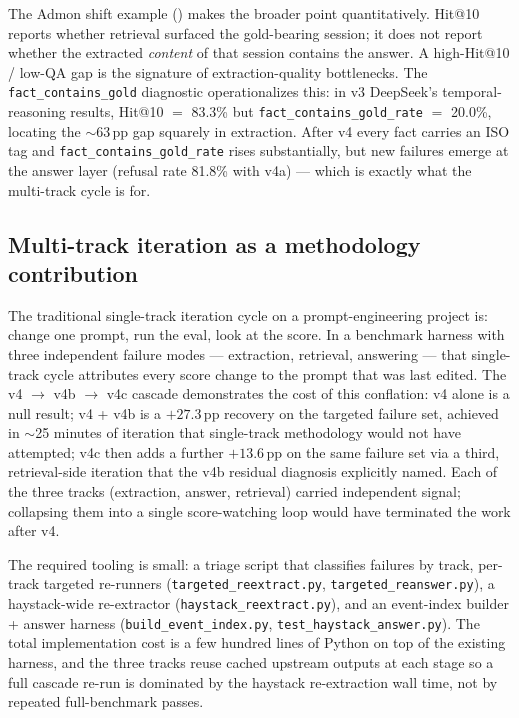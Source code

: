 \documentclass{article}
\begin{document}
The Admon shift example () makes the broader point quantitatively. Hit@10 reports whether retrieval surfaced the gold-bearing session; it does not report whether the extracted \emph{content} of that session contains the answer. A high-Hit@10 / low-QA gap is the signature of extraction-quality bottlenecks. The \texttt{fact\_contains\_gold} diagnostic operationalizes this: in v3 DeepSeek's temporal-reasoning results, Hit@10 $=$ 83.3\% but \texttt{fact\_contains\_gold\_rate} $=$ 20.0\%, locating the $\sim$63\,pp gap squarely in extraction. After v4 every fact carries an ISO tag and \texttt{fact\_contains\_gold\_rate} rises substantially, but new failures emerge at the answer layer (refusal rate 81.8\% with v4a) --- which is exactly what the multi-track cycle is for.

\subsection{Multi-track iteration as a methodology contribution}

The traditional single-track iteration cycle on a prompt-engineering project is: change one prompt, run the eval, look at the score. In a benchmark harness with three independent failure modes --- extraction, retrieval, answering --- that single-track cycle attributes every score change to the prompt that was last edited. The v4 $\to$ v4b $\to$ v4c cascade demonstrates the cost of this conflation: v4 alone is a null result; v4 + v4b is a $+27.3$\,pp recovery on the targeted failure set, achieved in $\sim$25 minutes of iteration that single-track methodology would not have attempted; v4c then adds a further $+13.6$\,pp on the same failure set via a third, retrieval-side iteration that the v4b residual diagnosis explicitly named. Each of the three tracks (extraction, answer, retrieval) carried independent signal; collapsing them into a single score-watching loop would have terminated the work after v4.

The required tooling is small: a triage script that classifies failures by track, per-track targeted re-runners (\texttt{targeted\_reextract.py}, \texttt{targeted\_reanswer.py}), a haystack-wide re-extractor (\texttt{haystack\_reextract.py}), and an event-index builder + answer harness (\texttt{build\_event\_index.py}, \texttt{test\_haystack\_answer.py}). The total implementation cost is a few hundred lines of Python on top of the existing harness, and the three tracks reuse cached upstream outputs at each stage so a full cascade re-run is dominated by the haystack re-extraction wall time, not by repeated full-benchmark passes.
\end{document}
